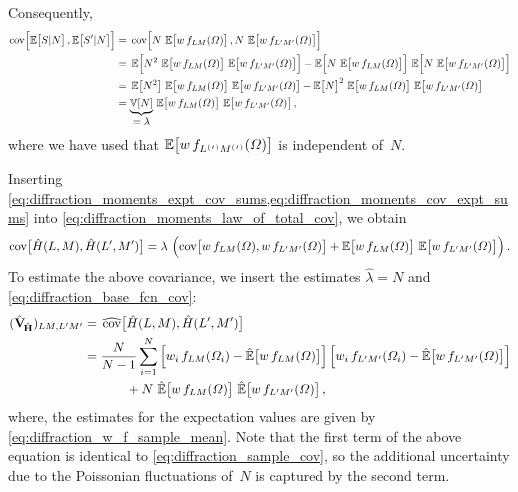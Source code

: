 Consequently,
\begin{align}
  \cov[2]{\exptVal[1]{S | N}, \exptVal[1]{S' | N}}
  ={}& \cov[2]{N\, \exptVal[1]{w\, f_{L M}(\Omega)}, N\, \exptVal[1]{w\, f_{L' M'}(\Omega)}}
  \nonumber \\
  ={}& \exptVal[2]{N^2\, \exptVal[1]{w\, f_{L M}(\Omega)}\, \exptVal[1]{w\, f_{L' M'}(\Omega)}}
  - \exptVal[2]{N\, \exptVal[1]{w\, f_{L M}(\Omega)}}\, \exptVal[2]{N\, \exptVal[1]{w\, f_{L' M'}(\Omega)}}
  \nonumber \\
  ={}& \exptVal[1]{N^2}\, \exptVal[1]{w\, f_{L M}(\Omega)}\, \exptVal[1]{w\, f_{L' M'}(\Omega)}
  - \exptVal[1]{N}^2\, \exptVal[1]{w\, f_{L M}(\Omega)}\, \exptVal[1]{w\, f_{L' M'}(\Omega)}
  \nonumber \\
  \label{eq:diffraction_moments_cov_expt_sums}
  ={}& \cdUnderbrace{\var{N}}{= \lambda}\, \exptVal[1]{w\, f_{L M}(\Omega)}\, \exptVal[1]{w\, f_{L' M'}(\Omega)},
\end{align}
where we have used that $\exptVal[1]{w\, f_{\orPr{L}
\orPr{M}}(\Omega)}$ is independent of~$N$.

Inserting
\cref{eq:diffraction_moments_expt_cov_sums,eq:diffraction_moments_cov_expt_sums}
into \cref{eq:diffraction_moments_law_of_total_cov}, we obtain
\begin{equation}
  \cov[1]{\hat{H}(L, M), \hat{H}(L', M')}
  = \lambda\, \rBrk[2]{\cov[1]{w\, f_{L M}(\Omega), w\, f_{L' M'}(\Omega)}
    + \exptVal[1]{w\, f_{L M}(\Omega)}\, \exptVal[1]{w\, f_{L' M'}(\Omega)}}.
\end{equation}
To estimate the above covariance, we insert the estimates $\hat{\lambda} = N$ and
\cref{eq:diffraction_base_fcn_cov}:
\begin{align}
  (\covMatEstSym_{\!\hat{\vect{H}}})_{L M, L' M'}
  ={}& \covEst[1]{\hat{H}(L, M), \hat{H}(L', M')}
  \nonumber \\
  ={}& \frac{N}{N - 1} \sum_{i = 1}^N
  \sBrk[2]{w_i\, f_{L M}(\Omega_i) - \exptValEst[1]{w\, f_{L M}(\Omega)}} \sBrk[2]{w_i\, f_{L' M'}(\Omega_i) - \exptValEst[1]{w\, f_{L' M'}(\Omega)}}
  \nonumber \\
  \label{eq:diffraction_sample_cov_poisson}
  {}&\qquad + N\, \exptValEst[1]{w\, f_{L M}(\Omega)}\, \exptValEst[1]{w\, f_{L' M'}(\Omega)},
\end{align}
where, the estimates for the expectation values are given by
\cref{eq:diffraction_w_f_sample_mean}.  Note that the first term of
the above equation is identical to \cref{eq:diffraction_sample_cov},
so the additional uncertainty due to the Poissonian fluctuations
of~$N$ is captured by the second term.


